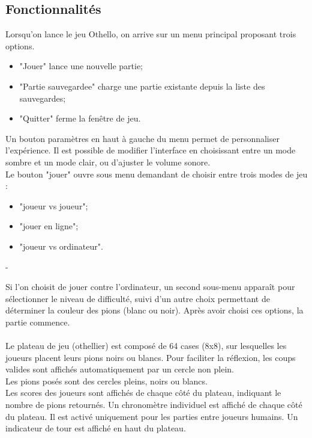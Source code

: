 \documentclass[12pt, a4paper, oneside]{article}
\begin{document}
    \subsection{Fonctionnalités}
        Lorsqu'on lance le jeu Othello, on arrive sur un menu principal proposant trois options. \\
        \begin{itemize}
        \item "Jouer" lance une nouvelle partie;
        \item "Partie sauvegardee" charge une partie existante depuis la liste des sauvegardes;
        \item "Quitter" ferme la fenêtre de jeu.
        \end{itemize}

Un bouton paramètres en haut à gauche du menu permet de personnaliser l'expérience. 
        Il est possible de modifier l'interface en choisissant entre un mode sombre et un 
        mode clair, ou d'ajuster le volume sonore. \\

Le bouton "jouer" ouvre sous menu demandant de choisir entre trois modes de jeu : \\
        \begin{itemize}
            \item "joueur vs joueur";
            \item "jouer en ligne";
            \item "joueur vs ordinateur".            
        \end{itemize}- 
        
        Si l'on choisit de jouer contre l'ordinateur, un second sous-menu apparaît pour sélectionner le niveau de difficulté, 
        suivi d'un autre choix permettant de déterminer la couleur des pions (blanc ou noir). Après avoir choisi ces options, 
        la partie commence. \\ \\

        Le plateau de jeu (othellier) est composé de 64 cases (8x8), sur lesquelles les joueurs placent leurs pions noirs ou blancs. 
        Pour faciliter la réflexion, les coups valides sont affichés automatiquement par un cercle non plein.\\
        
        Les pions posés sont des cercles pleins, noirs ou blancs. \\
        
        Les scores des joueurs sont affichés de chaque côté du plateau, indiquant le nombre de pions retournés. Un chronomètre 
        individuel est affiché de chaque côté du plateau. Il est activé uniquement pour les parties entre joueurs humains.
        Un indicateur de tour est affiché en haut du plateau. \\
        
\end{document}
